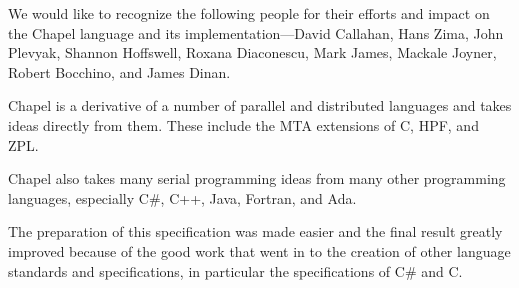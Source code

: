 \label{Acknowledgments}

We would like to recognize the following people for their efforts and
impact on the Chapel language and its implementation---David Callahan,
Hans Zima, John Plevyak, Shannon Hoffswell, Roxana Diaconescu, Mark
James, Mackale Joyner, Robert Bocchino, and James Dinan.

Chapel is a derivative of a number of parallel and distributed
languages and takes ideas directly from them.  These include the MTA
extensions of C, HPF, and ZPL.

Chapel also takes many serial programming ideas from many other
programming languages, especially C\#, C++, Java, Fortran, and Ada.

The preparation of this specification was made easier and the final
result greatly improved because of the good work that went in to the
creation of other language standards and specifications, in particular
the specifications of C\# and C.
